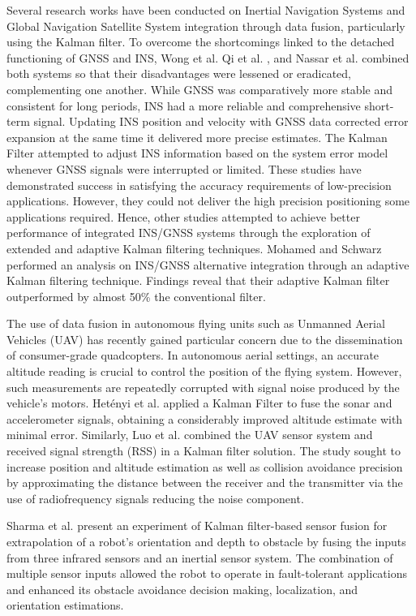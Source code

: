 Several research works have been conducted on Inertial Navigation Systems and Global Navigation Satellite System integration through data fusion, particularly using the Kalman filter. To overcome the shortcomings linked to the detached functioning of GNSS and INS, Wong et al. \cite{wong1988high} Qi et al. \cite{qi2002direct}, and Nassar et al. \cite{nassar2004improving} combined both systems so that their disadvantages were lessened or eradicated, complementing one another. While GNSS was comparatively more stable and consistent for long periods, INS had a more reliable and comprehensive short-term signal. Updating INS position and velocity with GNSS data corrected error expansion at the same time it delivered more precise estimates. The Kalman Filter attempted to adjust INS information based on the system error model whenever GNSS signals were interrupted or limited. These studies have demonstrated success in satisfying the accuracy requirements of low-precision applications. However, they could not deliver the high precision positioning some applications required. Hence, other studies attempted to achieve better performance of integrated INS/GNSS systems through the exploration of extended and adaptive Kalman filtering techniques. Mohamed and Schwarz \cite{mohamed1999adaptive} performed an analysis on INS/GNSS alternative integration through an adaptive Kalman filtering technique. Findings reveal that their adaptive Kalman filter outperformed by almost 50\% the conventional filter.

The use of data fusion in autonomous flying units such as Unmanned Aerial Vehicles (UAV) has recently gained particular concern due to the dissemination of consumer-grade quadcopters. In autonomous aerial settings, an accurate altitude reading is crucial to control the position of the flying system. However, such measurements are repeatedly corrupted with signal noise produced by the vehicle's motors. Hetényi et al. \cite{hetenyi2016sensor} applied a Kalman Filter to fuse the sonar and accelerometer signals, obtaining a considerably improved altitude estimate with minimal error. Similarly, Luo et al. \cite{luo2013uav} combined the UAV sensor system and received signal strength (RSS) in a Kalman filter solution. The study sought to increase position and altitude estimation as well as collision avoidance precision by approximating the distance between the receiver and the transmitter via the use of radiofrequency signals reducing the noise component.

Sharma et al. \cite{sharma2014sensor} present an experiment of Kalman filter-based sensor fusion for extrapolation of a robot's orientation and depth to obstacle by fusing the inputs from three infrared sensors and an inertial sensor system. The combination of multiple sensor inputs allowed the robot to operate in fault-tolerant applications and enhanced its obstacle avoidance decision making, localization, and orientation estimations.

